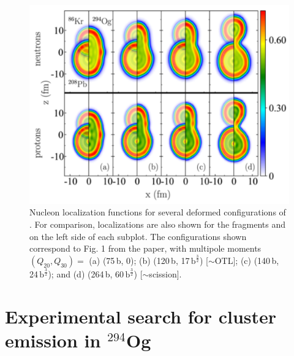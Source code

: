 \begin{figure}
	\centering
	\includegraphics[width=0.9\linewidth]{TeX_files/294Og_locali}
	\caption[Nucleon localization visualization of $^{294}$Og prefragment formation.]{Nucleon localization functions for several deformed configurations of {\Og}. For comparison, localizations are also shown for the fragments {\Pb} and {\Kr} on the left side of each subplot. The configurations shown correspond to Fig. 1 from the paper, with multipole moments $(Q_{20}, Q_{30})=$ (a) (75\,b, 0); (b) (120\,b, 17\,$\mathrm{b}^\frac{3}{2}$) [${\sim}$OTL]; (c) (140\,b, 24\,$\mathrm{b}^\frac{3}{2}$); and (d) (264\,b, 60\,$\mathrm{b}^\frac{3}{2}$) [${\sim}$scission].}
	\label{fig:294oglocali}
\end{figure}



\section{Experimental search for cluster emission in $^{294}$Og}

